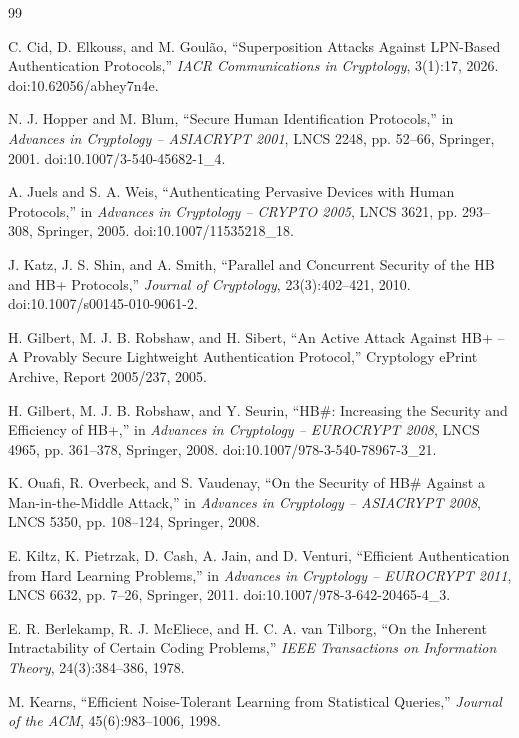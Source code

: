 \documentclass[10pt,twocolumn]{article}
\theoremstyle{definition}
\begin{document}
\begin{thebibliography}{99}
\footnotesize

 C. Cid, D. Elkouss, and M. Goul\~ao, ``Superposition Attacks Against LPN-Based Authentication Protocols,'' \emph{IACR Communications in Cryptology}, 3(1):17, 2026. doi:10.62056/abhey7n4e.

 N. J. Hopper and M. Blum, ``Secure Human Identification Protocols,'' in \emph{Advances in Cryptology -- ASIACRYPT 2001}, LNCS 2248, pp. 52--66, Springer, 2001. doi:10.1007/3-540-45682-1\_4.

 A. Juels and S. A. Weis, ``Authenticating Pervasive Devices with Human Protocols,'' in \emph{Advances in Cryptology -- CRYPTO 2005}, LNCS 3621, pp. 293--308, Springer, 2005. doi:10.1007/11535218\_18.

 J. Katz, J. S. Shin, and A. Smith, ``Parallel and Concurrent Security of the HB and HB+ Protocols,'' \emph{Journal of Cryptology}, 23(3):402--421, 2010. doi:10.1007/s00145-010-9061-2.

 H. Gilbert, M. J. B. Robshaw, and H. Sibert, ``An Active Attack Against HB+ -- A Provably Secure Lightweight Authentication Protocol,'' Cryptology ePrint Archive, Report 2005/237, 2005.

 H. Gilbert, M. J. B. Robshaw, and Y. Seurin, ``HB\#: Increasing the Security and Efficiency of HB+,'' in \emph{Advances in Cryptology -- EUROCRYPT 2008}, LNCS 4965, pp. 361--378, Springer, 2008. doi:10.1007/978-3-540-78967-3\_21.

 K. Ouafi, R. Overbeck, and S. Vaudenay, ``On the Security of HB\# Against a Man-in-the-Middle Attack,'' in \emph{Advances in Cryptology -- ASIACRYPT 2008}, LNCS 5350, pp. 108--124, Springer, 2008.

 E. Kiltz, K. Pietrzak, D. Cash, A. Jain, and D. Venturi, ``Efficient Authentication from Hard Learning Problems,'' in \emph{Advances in Cryptology -- EUROCRYPT 2011}, LNCS 6632, pp. 7--26, Springer, 2011. doi:10.1007/978-3-642-20465-4\_3.

 E. R. Berlekamp, R. J. McEliece, and H. C. A. van Tilborg, ``On the Inherent Intractability of Certain Coding Problems,'' \emph{IEEE Transactions on Information Theory}, 24(3):384--386, 1978.

 M. Kearns, ``Efficient Noise-Tolerant Learning from Statistical Queries,'' \emph{Journal of the ACM}, 45(6):983--1006, 1998.


\end{thebibliography}
\end{document}
